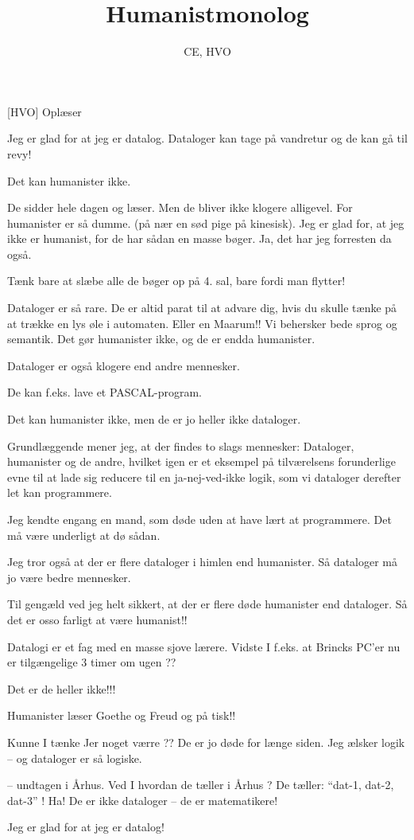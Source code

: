 \documentclass[a4paper,11pt]{article}
\title{Humanistmonolog}
\author{CE, HVO}
\begin{document}
\maketitle

\begin{roles}
[HVO] Oplæser
\end{roles}


\begin{sketch}


 Jeg er glad for at jeg er datalog.  Dataloger kan tage på vandretur og
de kan gå til revy!

Det kan humanister ikke.

De sidder hele dagen og læser. Men de bliver ikke klogere alligevel. For
humanister er så dumme. (på nær en sød pige på kinesisk). Jeg er glad for, at
jeg ikke er humanist, for de har sådan en masse bøger. Ja, det har jeg forresten
da også.

Tænk bare at slæbe alle de bøger op på 4. sal, bare fordi man flytter!

Dataloger er så rare. De er altid parat til at advare dig, hvis du skulle tænke
på at trække en lys øle i automaten. Eller en Maarum!! Vi behersker bede sprog
og semantik. Det gør humanister ikke, og de er endda humanister.

Dataloger er også klogere end andre mennesker.

De kan f.eks. lave et PASCAL-program.

Det kan humanister ikke, men de er jo heller ikke dataloger.

Grundlæggende mener jeg, at der findes to slags mennesker: Dataloger, humanister
og de andre, hvilket igen er et eksempel på tilværelsens forunderlige evne til
at lade sig reducere til en ja-nej-ved-ikke logik, som vi dataloger derefter let
kan programmere.

Jeg kendte engang en mand, som døde uden at have lært at programmere.  Det må
være underligt at dø sådan.

Jeg tror også at der er flere dataloger i himlen end humanister. Så dataloger må
jo være bedre mennesker.

Til gengæld ved jeg helt sikkert, at der er flere døde humanister end
dataloger. Så det er osso farligt at være humanist!!

Datalogi er et fag med en masse sjove lærere. Vidste I f.eks. at Brincks PC'er
nu er tilgængelige 3 timer om ugen ??

Det er de heller ikke!!!

Humanister læser Goethe og Freud og på tisk!!

Kunne I tænke Jer noget værre ?? De er jo døde for længe siden. Jeg ælsker logik
-- og dataloger er så logiske.

-- undtagen i Århus.  Ved I hvordan de tæller i Århus ? De tæller: ``dat-1,
dat-2, dat-3'' !  Ha! De er ikke dataloger -- de er matematikere!

Jeg er glad for at jeg er datalog!

\end{sketch}
\end{document}
